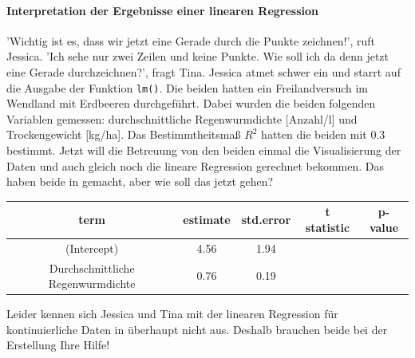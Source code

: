 \documentclass[a4paper, 9pt]{scrartcl}\usepackage[]{graphicx}\usepackage[]{xcolor}
\begin{document}
\ifcollection
\paragraph{Interpretation der Ergebnisse einer linearen Regression}
\fi

'Wichtig ist es, dass wir jetzt eine Gerade durch die Punkte zeichnen!', ruft Jessica. 'Ich sehe nur zwei Zeilen und keine Punkte. Wie soll ich da denn jetzt eine Gerade durchzeichnen?', fragt Tina. Jessica atmet schwer ein und starrt auf die \Rlogo Ausgabe der Funktion \texttt{lm()}. Die beiden hatten ein Freilandversuch im Wendland mit Erdbeeren durchgeführt. Dabei wurden die beiden folgenden Variablen gemessen: durchschnittliche Regenwurmdichte [Anzahl/l] und Trockengewicht [kg/ha]. Das Bestimmtheitsmaß $R^2$ hatten die beiden mit 0.3 bestimmt.  Jetzt will die Betreuung von den beiden einmal die Visualisierung der Daten und auch gleich noch die lineare Regression gerechnet bekommen. Das haben beide in \Rlogo gemacht, aber wie soll das jetzt gehen?

\begin{table}[!h]
\centering\begingroup\fontsize{11}{13}\selectfont

\begin{tabular}{ccccc}
\toprule
term & estimate & std.error & t statistic & p-value\\
\midrule
(Intercept) & 4.56 & 1.94 &  & \\
Durchschnittliche Regenwurmdichte & 0.76 & 0.19 &  & \\
\bottomrule
\end{tabular}
\endgroup{}
\end{table}



Leider kennen sich Jessica und Tina mit der linearen Regression für kontinuierliche Daten in \Rlogo überhaupt nicht aus. Deshalb brauchen beide bei der Erstellung Ihre Hilfe!
\end{document}
